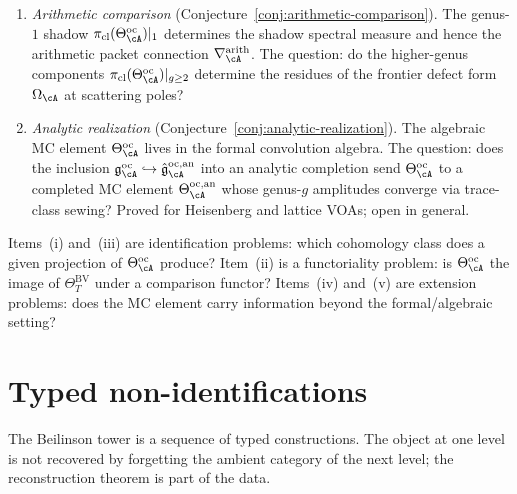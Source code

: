 \begin{remark}
\begin{enumerate}[label=\textup{(\roman*)}]
\item \emph{Arithmetic comparison}
 \textup{(}Conjecture~\ref{conj:arithmetic-comparison}\textup{)}.
 The genus-$1$ shadow $\pi_{\mathrm{cl}}(\Theta^{\mathrm{oc}}_\cA)|_1$
 determines the shadow spectral measure and hence the arithmetic
 packet connection $\nabla^{\mathrm{arith}}_\cA$.
 The question: do the higher-genus components
 $\pi_{\mathrm{cl}}(\Theta^{\mathrm{oc}}_\cA)|_{g \geq 2}$
 determine the residues of the frontier defect form $\Omega_\cA$
 at scattering poles?

\item \emph{Analytic realization}
 \textup{(}Conjecture~\ref{conj:analytic-realization}\textup{)}.
 The algebraic MC element $\Theta^{\mathrm{oc}}_\cA$ lives in the
 formal convolution algebra. The question: does the inclusion
 $\mathfrak{g}^{\mathrm{oc}}_\cA \hookrightarrow
 \hat{\mathfrak{g}}{}^{\mathrm{oc},\mathrm{an}}_\cA$
 into an analytic completion send $\Theta^{\mathrm{oc}}_\cA$ to a
 completed MC element
 $\Theta^{\mathrm{oc},\mathrm{an}}_\cA$
 whose genus-$g$ amplitudes converge via trace-class sewing?
 Proved for Heisenberg and lattice VOAs; open in general.
\end{enumerate}
Items~(i) and~(iii) are identification problems: which cohomology
class does a given projection of $\Theta^{\mathrm{oc}}_\cA$ produce?
Item~(ii) is a functoriality problem: is $\Theta^{\mathrm{oc}}_\cA$
the image of $\Theta^{\mathrm{BV}}_T$ under a comparison functor?
Items~(iv) and~(v) are extension problems: does the MC element
carry information beyond the formal/algebraic setting?
\end{remark}

\section{Typed non-identifications}
\label{sec:concordance-typed-nonidentifications}

The Beilinson tower is a sequence of typed constructions.  The object
at one level is not recovered by forgetting the ambient category of the
next level; the reconstruction theorem is part of the data.

